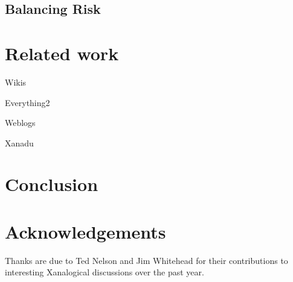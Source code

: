 \documentclass{acm_proc_article-sp}
\begin{document}
\subsection{Balancing Risk}



\section{Related work}

Wikis
\cite{WikiWikiWeb}
\cite{Wikipedia}

Everything2
\cite{Everything2}

Weblogs
\cite{kuro5hin}

Xanadu

\section{Conclusion}


\section{Acknowledgements}
Thanks are due to Ted Nelson and Jim Whitehead for their contributions to interesting Xanalogical discussions over the past year.



\end{document}
